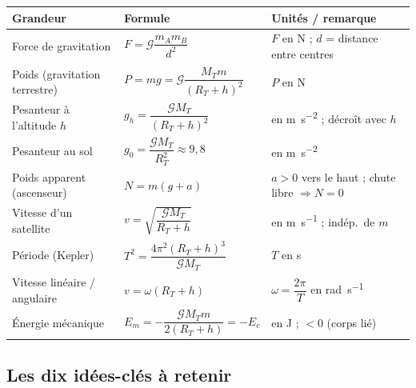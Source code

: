 \documentclass[11pt,a4paper]{article}
\newcommand{\Grav}{\mathcal{G}}        %
\begin{document}
\begin{center}
\renewcommand{\arraystretch}{1.7}
\begin{tabular}{>{\raggedright\arraybackslash}p{4.6cm} >{\centering\arraybackslash}p{4.6cm} >{\raggedright\arraybackslash}p{5.2cm}}
\toprule
\rowcolor{primary!15}
\textbf{Grandeur} & \textbf{Formule} & \textbf{Unités / remarque} \\
\midrule
Force de gravitation & $F=\Grav\dfrac{m_A m_B}{d^2}$ & $F$ en \si{\newton} ; $d$ = distance entre centres \\
\rowcolor{primary!7}
Poids (gravitation terrestre) & $P=mg=\Grav\dfrac{M_T m}{(R_T+h)^2}$ & $P$ en \si{\newton} \\
Pesanteur à l'altitude $h$ & $g_h=\dfrac{\Grav M_T}{(R_T+h)^2}$ & en \si{\metre\per\second\squared} ; décroît avec $h$ \\
\rowcolor{primary!7}
Pesanteur au sol & $g_0=\dfrac{\Grav M_T}{R_T^2}\approx 9{,}8$ & en \si{\metre\per\second\squared} \\
Poids apparent (ascenseur) & $N=m(g+a)$ & $a>0$ vers le haut ; chute libre $\Rightarrow N=0$ \\
\rowcolor{primary!7}
Vitesse d'un satellite & $v=\sqrt{\dfrac{\Grav M_T}{R_T+h}}$ & en \si{\metre\per\second} ; indép.\ de $m$ \\
Période (Kepler) & $T^2=\dfrac{4\pi^2(R_T+h)^3}{\Grav M_T}$ & $T$ en \si{\second} \\
\rowcolor{primary!7}
Vitesse linéaire / angulaire & $v=\omega(R_T+h)$ & $\omega=\dfrac{2\pi}{T}$ en \si{\radian\per\second} \\
Énergie mécanique & $E_m=-\dfrac{\Grav M_T m}{2(R_T+h)}=-E_c$ & en \si{\joule} ; $<0$ (corps lié) \\
\bottomrule
\end{tabular}
\end{center}

\subsection{Les dix idées-clés à retenir}
\end{document}
